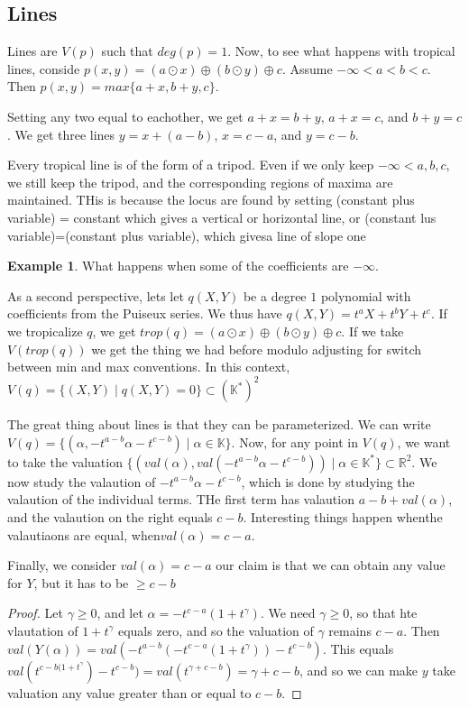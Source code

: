 \documentclass[11pt]{article}
\theoremstyle{definition}
\theoremstyle{plain}%
\theoremstyle{definition}
\newtheorem{protoexample}{Example}[section]
\newenvironment{ex}
   {\colorlet{shadecolor}{red!15}\begin{shaded}\begin{protoexample}}
   {\end{protoexample}\end{shaded}}
\def\RR{{\mathbb R}}
\def\KK{{\mathbb K}}
\begin{document}
\subsection{Lines}
Lines are $V(p)$ such that $deg(p)=1$.
Now, to see what happens with tropical lines, conside $p(x,y) = (a \odot x) \oplus (b \odot y) \oplus c$. Assume $-\infty<a<b<c$. Then $p(x,y) = max\{ a+x,b+y,c\}$.

Setting any two equal to eachother, we get $a+x=b+y$, $a+x=c$, and $b+y=c$. We get three lines $y=x+(a-b)$, $x=c-a$, and $y=c-b$.

Every tropical line is of the form of a tripod. Even if we only keep $-\infty< a,b,c$, we still keep the tripod, and the corresponding regions of maxima are maintained. THis is because the locus are found by setting (constant plus variable) = constant which gives a vertical or horizontal line, or (constant lus variable)=(constant plus variable), which givesa  line of slope one


\begin{ex}
    What happens when some of the coefficients are $-\infty$.
\end{ex}



As a second perspective, lets let $q(X,Y)$ be a degree $1$ polynomial with coefficients from the Puiseux  series. We thus have $q(X,Y)=t^aX+t^bY+t^c$. If we tropicalize $q$, we get $trop(q)=(a \odot x) \oplus (b \odot y) \oplus c$. If we take $V(trop (q))$ we get the thing we had before modulo adjusting for switch between min and max conventions. In this context, $V(q) = \{(X,Y)\; |\; q(X,Y)=0\} \subset (\KK^*)^2$


The great thing about lines is that they can be parameterized. We can write $V(q)= \{(\alpha, -t^{a-b}\alpha -t^{c-b})\; |\; \alpha \in \KK\}$. Now, for any point in $V(q)$, we want to take the valuation $\{(val(\alpha),val( -t^{a-b}\alpha -t^{c-b}))\; |\; \alpha \in \KK^*\} \subset \RR^2$. We now study the valaution of $-t^{a-b}\alpha -t^{c-b}$, which is done by studying the valaution of the individual terms. THe first term has valaution $a-b + val(\alpha)$, and the valaution on the right equals $c-b$. Interesting things happen whenthe valautiaons are equal, when$ val(\alpha)= c-a$.


Finally, we consider $val(\alpha) = c-a$ our claim is that we can obtain any value for $Y$, but it has to be $\geq c-b$

\begin{proof}
    Let $\gamma \geq 0$, and let $\alpha =-t^{c-a}(1+t^\gamma)$. We need $\gamma \geq 0$, so that hte vlautation of $1+t^{\gamma}$ equals zero, and so the valuation of $\gamma$ remains $c-a$. Then $val(Y(\alpha)) =val(-t^{a-b}(-t^{c-a}(1+t^\gamma)) - t^{c-b} )$. This equals $val(t^{c-b(1+t^\gamma}) -t^{c-b}) = val(t^{\gamma +c-b}) = \gamma+c-b$, and so we can make $y$ take valuation any value greater than or equal to $c-b$.
\end{proof}
\end{document}
